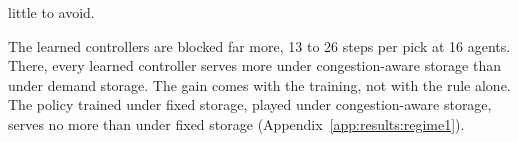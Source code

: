 little to avoid.

The learned controllers are blocked far more, 13 to 26 steps per pick at 16
agents. There, every learned controller serves more under congestion-aware
storage than under demand storage. The gain comes with the training, not
with the rule alone. The policy trained under fixed storage, played under
congestion-aware storage, serves no more than under fixed storage
(Appendix~\ref{app:results:regime1}).
